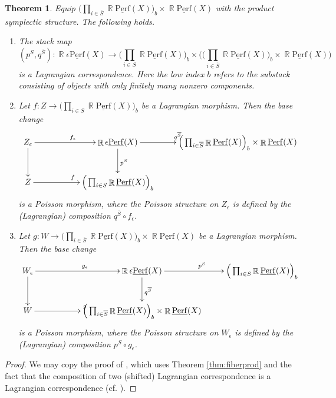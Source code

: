 \documentclass[reqno]{amsart}
\DeclareMathOperator\R{\mathbb R}
\newtheorem{theorem}{Theorem}[section]
\theoremstyle{definition}
\theoremstyle{remark}
\newcommand{\ul}{\underline}
\newcommand{\eps}{\epsilon}
\newcommand{\uperf}{\ul{\mathrm{Perf}}}
\newcommand{\ol}{\overline}
\numberwithin{equation}{section}
\begin{document}
\begin{theorem}\label{thm:basechange}
Equip $\Big(\prod_{i\in \ol{S}} \R\uperf(X)\Big)_b\times \R\uperf(X)$ with the product symplectic structure. The following holds.
\begin{enumerate}
\item[$(a)$]
The stack map 
\[
(p^{S},q^{\ol{S}}):\R\eps\uperf(X)\to \Big(\prod_{i\in S} \R\uperf(X)\Big)_b\times\Big(\Big(\prod_{i\in \ol{S}} \R\uperf(X)\Big)_b\times \R\uperf(X)\Big)
\] is a Lagrangian correspondence. Here the low index $b$ refers to the substack consisting of objects with only finitely many nonzero components.
\item[$(b)$] Let $f: Z\to  \Big(\prod_{i\in S} \R\uperf(X)\Big)_b$  be  a Lagrangian morphism. Then the base change 
\[
\xymatrix{
Z_\eps \ar[rr]^{f_\eps}\ar[d] &&\R\eps\uperf(X)\ar[d]^{p^S}\ar[r]^{q^{\ol{S}}} & \Big(\prod_{i\in \ol{S}} \R\uperf(X)\Big)_b\times \R\uperf(X)\\
Z\ar[rr]^f & &  \Big(\prod_{i\in S} \R\uperf(X)\Big)_b
}
\]  is a Poisson morphism, where the Poisson structure on $Z_\eps$ is defined by the (Lagrangian) composition $q^{\ol{S}}\circ f_\eps$.
\item[$(c)$] Let $g: W\to  \Big(\prod_{i\in \ol{S}} \R\uperf(X)\Big)_b \times \R\uperf(X)$ be  a Lagrangian morphism. Then the base change 
\[
\xymatrix{
W_\eps \ar[rr]^{g_\eps}\ar[d] &&\R\eps\uperf(X)\ar[d]^{q^{\ol{S}}}\ar[r]^{p^{S}} & \Big(\prod_{i\in S} \R\uperf(X)\Big)_b\\
W\ar[rr]^g& &  \Big(\prod_{i\in \ol{S}} \R\uperf(X)\Big)_b\times \R\uperf(X)
}
\]  is a Poisson morphism, where the Poisson structure on $W_\eps$ is defined by the (Lagrangian) composition $p^{S}\circ g_\eps$.
\end{enumerate}
\end{theorem}
\begin{proof}
We may copy the proof of \cite[Corollary 3.20]{HP1}, which uses Theorem \ref{thm:fiberprod} and the fact that the composition of two (shifted) Lagrangian correspondence is a Lagrangian correspondence (cf. \cite[Theorem 4.4]{Ca14}).
\end{proof}
\end{document}
